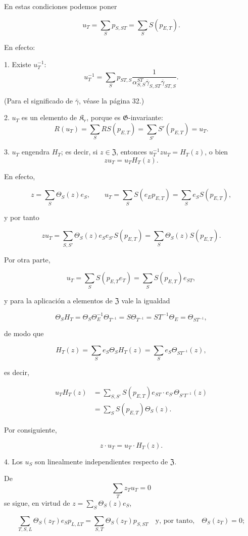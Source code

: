 En estas condiciones podemos poner

\[
u_T=\sum_S p_{S,ST}=\sum_S S(p_{E,T}).
\]

En efecto:

1. Existe \(u_T^{-1}\):
\[
u_T^{-1}=\sum_S p_{ST,S}
\frac{1}{\alpha_{S,S}^{ST}\overline{\gamma}_{S,ST}\overline{\gamma}_{ST,S}}.
\]

(Para el significado de \(\bar{\gamma}\), véase la página 32.)

2. \(u_T\) es un elemento de \(\mathfrak K_r\), porque es \(\mathfrak G\)-invariante:
\[
R(u_T)=\sum_S RS(p_{E,T})=\sum_{S'} S'(p_{E,T})=u_T.
\]

3. \(u_T\) engendra \(H_T\); es decir, si \(z\in\mathfrak Z\), entonces \(u_T^{-1}zu_T=H_T(z)\), o bien
\[
z u_T=u_T H_T(z).
\]

En efecto,

\[
z=\sum_S\Theta_S(z)e_S,\qquad
u_T=\sum_S S(e_Ep_{E,T})=\sum_S e_S S(p_{E,T}),
\]

y por tanto

\[
zu_T=\sum_{S,S'}\Theta_S(z)e_Se_{S'}S(p_{E,T})
=\sum_S\Theta_S(z)S(p_{E,T}).
\]

Por otra parte,

\[
u_T=\sum_S S(p_{E,T}e_T)=\sum_S S(p_{E,T})e_{ST},
\]

y para la aplicación a elementos de \(\mathfrak Z\) vale la igualdad

\[
\Theta_S H_T=\Theta_S\Theta_E^{-1}\Theta_{T^{-1}}
=S\Theta_{T^{-1}}=ST^{-1}\Theta_E=\Theta_{ST^{-1}},
\]

de modo que

\[
H_T(z)=\sum_S e_S\Theta_S H_T(z)=\sum_S e_S\Theta_{ST^{-1}}(z),
\]

es decir,

\[
\begin{aligned}
u_TH_T(z)
&=\sum_{S,S'} S(p_{E,T})e_{ST}\cdot e_{S'}\Theta_{S'T^{-1}}(z)\\
&=\sum_S S(p_{E,T})\Theta_S(z).
\end{aligned}
\]

Por consiguiente,

\[
z\cdot u_T=u_T\cdot H_T(z).
\]

4. Los \(u_S\) son linealmente independientes respecto de \(\mathfrak Z\).

De
\[
\sum_T z_Tu_T=0
\]
se sigue, en virtud de \(z=\sum_S\Theta_S(z)e_S\),

\[
\sum_{T,S,L}\Theta_S(z_T)e_Sp_{L,LT}
=\sum_{S,T}\Theta_S(z_T)p_{S,ST}\quad\text{y, por tanto,}\quad
\Theta_S(z_T)=0;
\]

